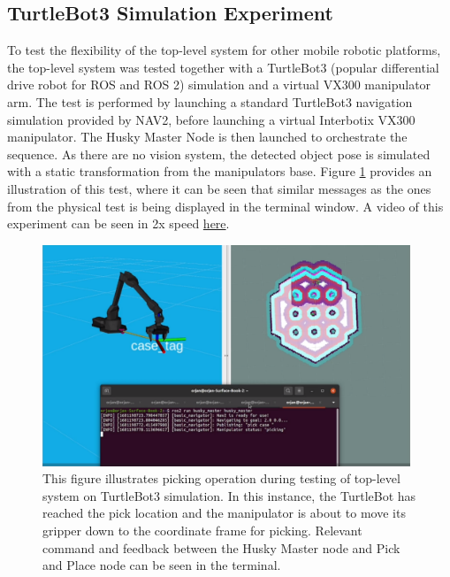 \subsection{TurtleBot3 Simulation Experiment}
To test the flexibility of the top-level system for other mobile robotic platforms, the top-level system was tested together with a TurtleBot3 (popular differential drive robot for ROS and ROS 2) simulation and a virtual VX300 manipulator arm. The test is performed by launching a standard TurtleBot3 navigation simulation provided by NAV2, before launching a virtual Interbotix VX300 manipulator. The Husky Master Node is then launched to orchestrate the sequence. As there are no vision system, the detected object pose is simulated with a static transformation from the manipulators base. Figure \ref{fig:R:WA:simTBTopLevel2} provides an illustration of this test, where it can be seen that similar messages as the ones from the physical test is being displayed in the terminal window. A video of this experiment can be seen in 2x speed \href{https://youtu.be/_Dy3rSTHWYo}{here}. 

\begin{figure}[H]
  \centering
  \includegraphics[width = 0.98\textwidth]{Figures/figSimTBTopLevel2.pdf}
  \caption{This figure illustrates picking operation during testing of top-level system on TurtleBot3 simulation. In this instance, the TurtleBot has reached the pick location and the manipulator is about to move its gripper down to the coordinate frame for picking. Relevant command and feedback between the Husky Master node and Pick and Place node can be seen in the terminal.}
  \label{fig:R:WA:simTBTopLevel2}
\end{figure}






